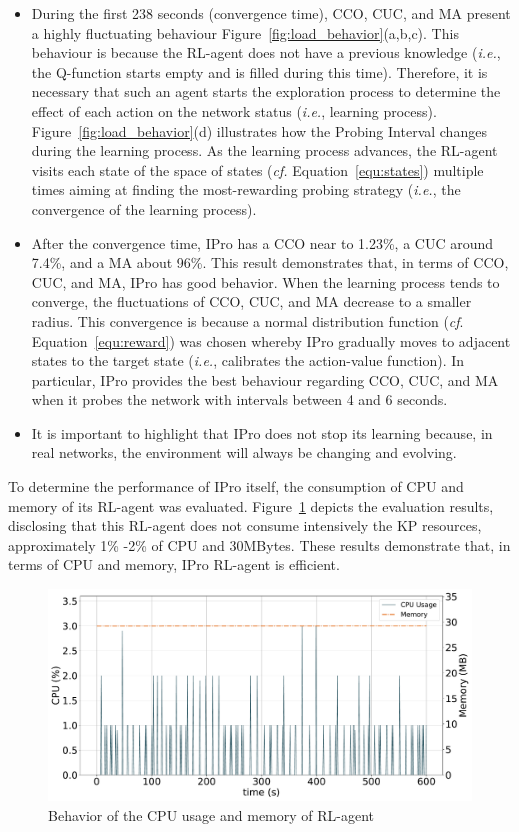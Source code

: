 \begin{itemize}
    \item During the first 238 seconds (convergence time), CCO, CUC, and MA present a highly fluctuating behaviour Figure~\ref{fig:load_behavior}(a,b,c). This behaviour is because the RL-agent does not have a previous knowledge (\textit{i.e.}, the Q-function starts empty and is filled during this time). Therefore, it is necessary that such an agent starts the exploration process to determine the effect of each action on the network status (\textit{i.e.}, learning process). Figure~\ref{fig:load_behavior}(d) illustrates how the Probing Interval changes during the learning process. As the learning process advances, the RL-agent visits each state of the space of states (\textit{cf.} Equation~\ref{equ:states}) multiple times aiming at finding the most-rewarding probing strategy (\textit{i.e.}, the convergence of the learning process).
    \item After the convergence time, IPro has a CCO near to 1.23\%, a CUC around 7.4\%, and a MA about 96\%. This result demonstrates that, in terms of CCO, CUC, and MA, IPro has good behavior. When the learning process tends to converge, the fluctuations of CCO, CUC, and MA decrease to a smaller radius. This convergence is because a normal distribution function (\textit{cf}. Equation~\ref{equ:reward}) was chosen whereby IPro gradually moves to adjacent states to the target state (\textit{i.e.}, calibrates the action-value function). In particular, IPro provides the best behaviour regarding CCO, CUC, and MA when it probes the network with intervals between 4 and 6 seconds.
    \item It is important to highlight that IPro does not stop its learning because, in real networks, the environment will always be changing and evolving.
\end{itemize}

To determine the performance of IPro itself, the consumption of CPU and memory of its RL-agent was evaluated. Figure~\ref{fig:rl-agent_behavior} depicts the evaluation results, disclosing that this RL-agent does not consume intensively the KP resources, approximately 1\% -2\% of CPU and 30MBytes. These results demonstrate that, in terms of CPU and memory, IPro RL-agent is efficient.

\begin{figure}[h!]
    \centering
    \includegraphics[width=1.0\textwidth]{figures/Figure13-cpu-usage-rl-agent}
    \caption{Behavior of the CPU usage and memory of RL-agent}
    \label{fig:rl-agent_behavior}
\end{figure}